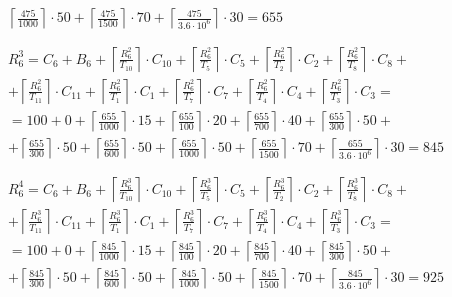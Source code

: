 \begin{gather*}
\begin{multlined}
    \left\lceil\frac{475}{1000}\right\rceil\cdot 50 +%
    \left\lceil\frac{475}{1500}\right\rceil\cdot 70 +%
    \left\lceil\frac{475}{3.6 \cdot 10^6}\right\rceil\cdot 30 = 655 \\
  \end{multlined} \\
  \begin{multlined}
    R_6^3 = C_6 + B_6 + \left\lceil\frac{R_6^2}{T_{10}}\right\rceil\cdot C_{10} + %
    \left\lceil\frac{R_6^2}{T_5}\right\rceil\cdot C_5 + %
    \left\lceil\frac{R_6^2}{T_2}\right\rceil\cdot C_2 + %
    \left\lceil\frac{R_6^2}{T_8}\right\rceil\cdot C_8 + \\%
    + \left\lceil\frac{R_6^2}{T_{11}}\right\rceil\cdot C_{11} + %
    \left\lceil\frac{R_6^2}{T_1}\right\rceil\cdot C_1 +%
    \left\lceil\frac{R_6^2}{T_7}\right\rceil\cdot C_7 +%
    \left\lceil\frac{R_6^2}{T_4}\right\rceil\cdot C_4 +%
    \left\lceil\frac{R_6^2}{T_3}\right\rceil\cdot C_3 = \\%
    = 100 + 0 + \left\lceil\frac{655}{1000}\right\rceil\cdot 15 + %
    \left\lceil\frac{655}{100}\right\rceil\cdot 20 + %
    \left\lceil\frac{655}{700}\right\rceil\cdot 40 + %
    \left\lceil\frac{655}{300}\right\rceil\cdot 50 + \\%
    + \left\lceil\frac{655}{300}\right\rceil\cdot 50 + %
    \left\lceil\frac{655}{600}\right\rceil\cdot 50 + %
    \left\lceil\frac{655}{1000}\right\rceil\cdot 50 +%
    \left\lceil\frac{655}{1500}\right\rceil\cdot 70 +%
    \left\lceil\frac{655}{3.6 \cdot 10^6}\right\rceil\cdot 30 = 845 \\
  \end{multlined} \\
  \begin{multlined}
    R_6^4 = C_6 + B_6 + \left\lceil\frac{R_6^3}{T_{10}}\right\rceil\cdot C_{10} + %
    \left\lceil\frac{R_6^3}{T_5}\right\rceil\cdot C_5 + %
    \left\lceil\frac{R_6^3}{T_2}\right\rceil\cdot C_2 + %
    \left\lceil\frac{R_6^3}{T_8}\right\rceil\cdot C_8 + \\%
    + \left\lceil\frac{R_6^3}{T_{11}}\right\rceil\cdot C_{11} + %
    \left\lceil\frac{R_6^3}{T_1}\right\rceil\cdot C_1 +%
    \left\lceil\frac{R_6^3}{T_7}\right\rceil\cdot C_7 +%
    \left\lceil\frac{R_6^3}{T_4}\right\rceil\cdot C_4 +%
    \left\lceil\frac{R_6^3}{T_3}\right\rceil\cdot C_3 = \\%
    = 100 + 0 + \left\lceil\frac{845}{1000}\right\rceil\cdot 15 + %
    \left\lceil\frac{845}{100}\right\rceil\cdot 20 + %
    \left\lceil\frac{845}{700}\right\rceil\cdot 40 + %
    \left\lceil\frac{845}{300}\right\rceil\cdot 50 + \\%
    + \left\lceil\frac{845}{300}\right\rceil\cdot 50 + %
    \left\lceil\frac{845}{600}\right\rceil\cdot 50 + %
    \left\lceil\frac{845}{1000}\right\rceil\cdot 50 +%
    \left\lceil\frac{845}{1500}\right\rceil\cdot 70 +%
    \left\lceil\frac{845}{3.6 \cdot 10^6}\right\rceil\cdot 30 = 925 \\
  \end{multlined} \\
\end{gather*}
